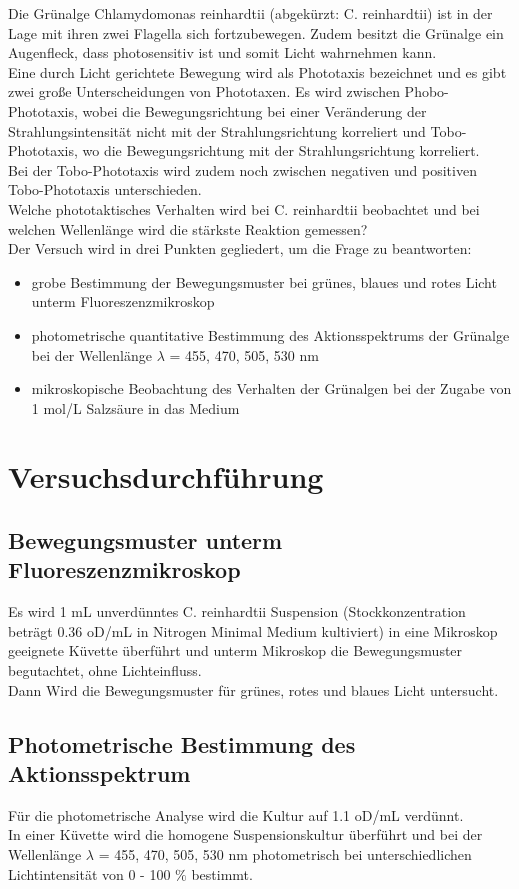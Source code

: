 \documentclass[10pt,a4paper]{article}
\begin{document}
	Die Grünalge Chlamydomonas reinhardtii  (abgekürzt: C. reinhardtii) ist in der Lage mit ihren zwei Flagella sich fortzubewegen. Zudem besitzt die Grünalge ein Augenfleck, dass photosensitiv ist und somit Licht wahrnehmen kann.\\
	Eine durch Licht gerichtete Bewegung wird als Phototaxis bezeichnet und es gibt zwei große Unterscheidungen von Phototaxen. Es wird zwischen Phobo-Phototaxis, wobei die Bewegungsrichtung bei einer Veränderung der Strahlungsintensität nicht mit der Strahlungsrichtung korreliert und Tobo-Phototaxis, wo die Bewegungsrichtung mit der Strahlungsrichtung korreliert.\\
	Bei der Tobo-Phototaxis wird zudem noch zwischen negativen und positiven Tobo-Phototaxis unterschieden.\\
	Welche phototaktisches Verhalten wird bei C. reinhardtii beobachtet und bei welchen Wellenlänge wird die stärkste Reaktion gemessen?\\
	Der Versuch wird in drei Punkten gegliedert, um die Frage zu beantworten:
	\begin{itemize}
		\item  grobe Bestimmung der Bewegungsmuster bei grünes, blaues und rotes Licht unterm Fluoreszenzmikroskop
		\item photometrische quantitative Bestimmung des Aktionsspektrums der Grünalge bei der Wellenlänge $\lambda$ = 455, 470, 505, 530 nm
		\item mikroskopische Beobachtung des Verhalten der Grünalgen bei der Zugabe von 1 mol/L Salzsäure in das Medium
	\end{itemize}
	
	\section{Versuchsdurchführung}
	\subsection{Bewegungsmuster unterm Fluoreszenzmikroskop}
	Es wird 1 mL unverdünntes C. reinhardtii Suspension (Stockkonzentration beträgt 0.36 oD/mL in Nitrogen Minimal Medium kultiviert) in eine Mikroskop geeignete Küvette überführt und unterm Mikroskop die Bewegungsmuster begutachtet, ohne Lichteinfluss.\\
	Dann Wird die Bewegungsmuster für grünes, rotes und blaues Licht untersucht.
	
	\subsection{Photometrische Bestimmung des Aktionsspektrum}
	Für die photometrische Analyse wird die Kultur auf 1.1 oD/mL verdünnt. \\
	In einer Küvette wird die homogene Suspensionskultur überführt und bei der Wellenlänge $\lambda$ = 455, 470, 505, 530 nm photometrisch bei unterschiedlichen Lichtintensität von 0 - 100 $\%$ bestimmt.
	
\end{document}
